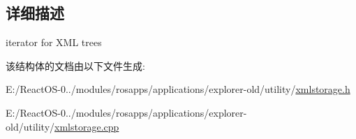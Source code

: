 \subsection{详细描述}
iterator for X\+ML trees 

该结构体的文档由以下文件生成\+:\begin{DoxyCompactItemize}
\item 
E\+:/\+React\+O\+S-\/0../modules/rosapps/applications/explorer-\/old/utility/\hyperlink{xmlstorage_8h}{xmlstorage.\+h}\item 
E\+:/\+React\+O\+S-\/0../modules/rosapps/applications/explorer-\/old/utility/\hyperlink{xmlstorage_8cpp}{xmlstorage.\+cpp}\end{DoxyCompactItemize}

